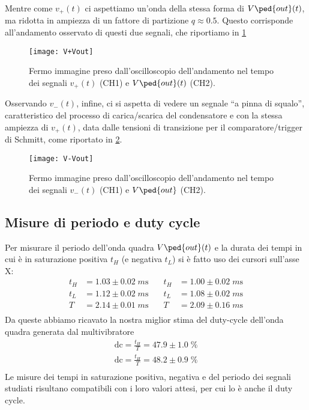 \documentclass[10pt, a4paper, italian]{article}
\begin{document}
Mentre come $v_+ (t)$ ci aspettiamo un'onda della stessa forma di
$V\ped{out} (t)$, ma ridotta in ampiezza di un fattore di partizione
$q \approx 0.5$. Questo corrisponde all'andamento osservato di questi due
segnali, che riportiamo in \cref{fig: v+vout}
\begin{figure}[htbp]
	\centering
	\texttt{[image: V+Vout]}
	\caption{Fermo immagine preso dall'oscilloscopio dell'andamento nel tempo dei
	segnali $v_+ (t)$ (CH1) e $V\ped{out} (t)$ (CH2). \label{fig: v+vout}}
\end{figure}

Osservando $v_- (t)$, infine, ci si aspetta di vedere un segnale ``a pinna di
squalo'', caratteristico del processo di carica/scarica del condensatore e
con la stessa ampiezza di $v_+ (t)$, data dalle tensioni di transizione per
il comparatore/trigger di Schmitt, come riportato in \cref{fig: v-vout}.
\begin{figure}[htbp]
	\centering
	\texttt{[image: V-Vout]}
	\caption{Fermo immagine preso dall'oscilloscopio dell'andamento nel tempo dei
	segnali $v_- (t)$ (CH1) e $V\ped{out}$ (CH2). \label{fig: v-vout}}
\end{figure}

\subsection{Misure di periodo e duty cycle}
Per misurare il periodo dell'onda quadra $V\ped{out} (t)$ e la durata dei
tempi in cui è in saturazione positiva $t_H$ (e negativa $t_L$) si è fatto
uso dei cursori sull'asse X:
\begin{align*}
t_H &= 1.03 \pm 0.02 \; \si{m\s} &\quad t_H &= 1.00 \pm 0.02 \; \si{m\s} \\
t_L &= 1.12 \pm 0.02 \; \si{m\s} &\quad t_L &= 1.08 \pm 0.02 \; \si{m\s} \\
T &= 2.14 \pm 0.01 \; \si{m\s}  &\quad T &= 2.09 \pm 0.16 \; \si{m\s} \\
\end{align*}
Da queste abbiamo ricavato la nostra miglior stima del duty-cycle dell'onda
quadra generata dal multivibratore
\begin{align*}
\mathrm{dc} = \frac{t_H}{T} = 47.9 \pm 1.0 \; \% \\
\mathrm{dc} = \frac{t_H}{T} = 48.2 \pm 0.9 \; \% \\
\end{align*}
Le misure dei tempi in saturazione positiva, negativa e del periodo dei
segnali studiati risultano compatibili con i loro valori attesi, per cui
lo è anche il duty cycle.
\end{document}
